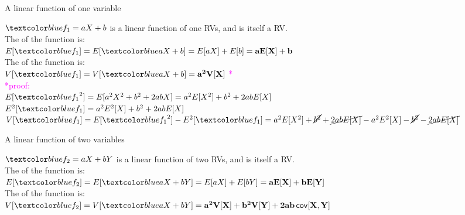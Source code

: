 \documentclass[10pt,sans,english,compress,xcolor=dvipsnames]{beamer}
\begin{document}
\begin{frame}{A linear function of one variable}

$ \bbl{f_1 = aX +b}$ is a linear function of one RVs, and is itself a RV.\\

The  of the function is:\\[1ex]
$E[\bbl{f_1} ] = E[ \bbl{aX + b} ] =  E[ aX] + E[ b ]  = \mathbf{a E[X] + b} $ \\

The  of the function is:\\[1ex]
$V[\bbl{f_1} ] = V[ \bbl{aX + b}] =  \mathbf{a^2 V[X]}$  \textcolor{magenta}{*} \\

\tiny
\textcolor{magenta}{*proof:}\\
$E[\bbl{f_1}^2] =  E[ a^2X^2 + b^2 + 2abX ]  = a^2 E[X^2] +b^2 + 2ab E[X] $\\[1ex]
$E^2[\bbl{f_1}] =   a^2 E^2[X] + b^2 + 2abE[X]$\\[1ex]
$ V[\bbl{f_1} ] = E[\bbl{f_1}^2] - E^2[\bbl{f_1}] = a^2 E[X^2] +\cancel{b^2} + \cancel{2ab E[X]} - a^2 E^2[X] - \cancel{b^2} - \cancel{2abE[X]}$\\

\end{frame} 



\begin{frame}{A linear function of two variables}

$ \bbl{f_2 = aX + bY}$ is a linear function of two RVs, and is itself a RV.\\


The  of the function is:\\[1ex]
$E[\bbl{f_2} ] = E[ \bbl{aX + bY} ] =   E[ aX] + E[bY ]  = \mathbf{a E[X] + b E[Y]}$ \\

The  of the function is:\\[1ex]
$V[\bbl{f_2} ] = V[ \bbl{aX + bY}] = \mathbf{ a^2 V[X] + b^2 V[Y]  + 2ab\, \mathsf{cov}[X,Y]}$   \\



\end{frame} 
\end{document}
